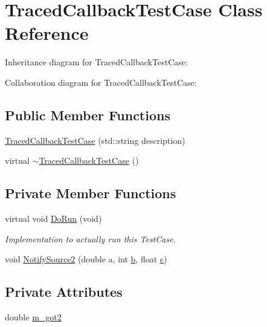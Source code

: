 \hypertarget{classTracedCallbackTestCase}{}\section{Traced\+Callback\+Test\+Case Class Reference}
\label{classTracedCallbackTestCase}


Inheritance diagram for Traced\+Callback\+Test\+Case\+:


Collaboration diagram for Traced\+Callback\+Test\+Case\+:
\subsection*{Public Member Functions}
\begin{DoxyCompactItemize}
\item 
\hyperlink{classTracedCallbackTestCase_a2eaf3e643fdb588c253fde0ed3384d16}{Traced\+Callback\+Test\+Case} (std\+::string description)
\item 
virtual \hyperlink{classTracedCallbackTestCase_ad19394e2f459c2d82791abd67f55a305}{$\sim$\+Traced\+Callback\+Test\+Case} ()
\end{DoxyCompactItemize}
\subsection*{Private Member Functions}
\begin{DoxyCompactItemize}
\item 
virtual void \hyperlink{classTracedCallbackTestCase_af901e0ed1e263452efcd2f4c9ebbba47}{Do\+Run} (void)
\begin{DoxyCompactList}\small\item\em Implementation to actually run this Test\+Case. \end{DoxyCompactList}\item 
void \hyperlink{classTracedCallbackTestCase_a391631ebb2a227e01dc94f93e93dd354}{Notify\+Source2} (double a, int \hyperlink{lte__pathloss_8m_a21ad0bd836b90d08f4cf640b4c298e7c}{b}, float \hyperlink{mmwave_2model_2fading-traces_2fading__trace__generator_8m_ae0323a9039add2978bf5b49550572c7c}{c})
\end{DoxyCompactItemize}
\subsection*{Private Attributes}
\begin{DoxyCompactItemize}
\item 
double \hyperlink{classTracedCallbackTestCase_a3a69dac6a5b1b0cf2828f5c3969c3a38}{m\+\_\+got2}
\end{DoxyCompactItemize}
